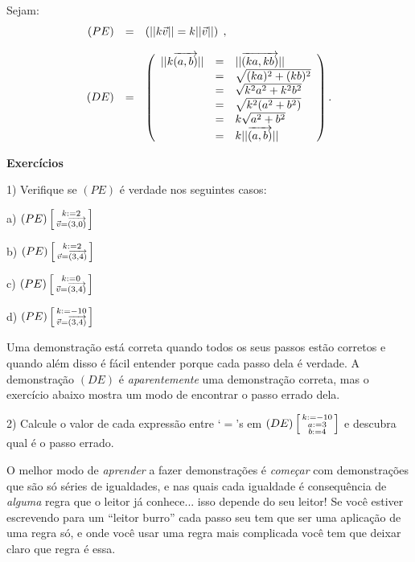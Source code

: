 \documentclass[oneside]{book}
\begin{document}
Sejam:
%
$$\begin{array}{rcl}
  (PE) &=& \left( ||k{\vec v}|| = k||{\vec v}|| \right) \; , \\
  \\
  (DE) &=& \left(
           \begin{array}{rcl}
           ||k{\overrightarrow{(a,b)}}|| &=& ||{\overrightarrow{(ka,kb)}}|| \\
                          &=& \sqrt{(ka)^2+(kb)^2} \\
                          &=& \sqrt{k^2a^2+k^2b^2} \\
                          &=& \sqrt{k^2(a^2+b^2)} \\
                          &=& k\sqrt{a^2+b^2} \\
                          &=& k||{\overrightarrow{(a,b)}}|| \\
           \end{array}
           \right) .\\
  \end{array}
$$

{\bf Exercícios}

1) Verifique se $(PE)$ é verdade nos seguintes casos:

a) $(PE) \left[\begin {smallmatrix}k:=2 \\ {\vec v}={\overrightarrow{(3,0)}}\end{smallmatrix}\right]$

b) $(PE) \left[\begin {smallmatrix}k:=2 \\ {\vec v}={\overrightarrow{(3,4)}}\end{smallmatrix}\right]$

c) $(PE) \left[\begin {smallmatrix}k:=0 \\ {\vec v}={\overrightarrow{(3,4)}}\end{smallmatrix}\right]$

d) $(PE) \left[\begin {smallmatrix}k:=-10 \\ {\vec v}={\overrightarrow{(3,4)}}\end{smallmatrix}\right]$

\msk

Uma demonstração está correta quando todos os seus passos estão
corretos e quando além disso é fácil entender porque cada passo dela é
verdade. A demonstração $(DE)$ é {\sl aparentemente} uma demonstração
correta, mas o exercício abaixo mostra um modo de encontrar o passo
errado dela.

\msk

2) Calcule o valor de cada expressão entre `$=$'s em $(DE)
\left[\begin {smallmatrix}k:=-10 \\ a:=3 \\ b:=4\\\end{smallmatrix}\right]$ e descubra qual é o passo errado.

\msk

O melhor modo de {\sl aprender} a fazer demonstrações é {\sl começar}
com demonstrações que são só séries de igualdades, e nas quais cada
igualdade é consequência de {\sl alguma} regra que o leitor já
conhece... isso depende do seu leitor! Se você estiver escrevendo para
um ``leitor burro'' cada passo seu tem que ser uma aplicação de uma
regra só, e onde você usar uma regra mais complicada você tem que
deixar claro que regra é essa.
\end{document}
